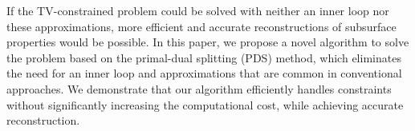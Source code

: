 If the TV-constrained problem could be solved with neither an inner loop nor these approximations, more efficient and accurate reconstructions of subsurface properties would be possible.
In this paper, we propose a novel algorithm to solve the problem based on the primal-dual splitting (PDS) method, which eliminates the need for an inner loop and approximations that are common in conventional approaches.
We demonstrate that our algorithm efficiently handles constraints without significantly increasing the computational cost, while achieving accurate reconstruction.





